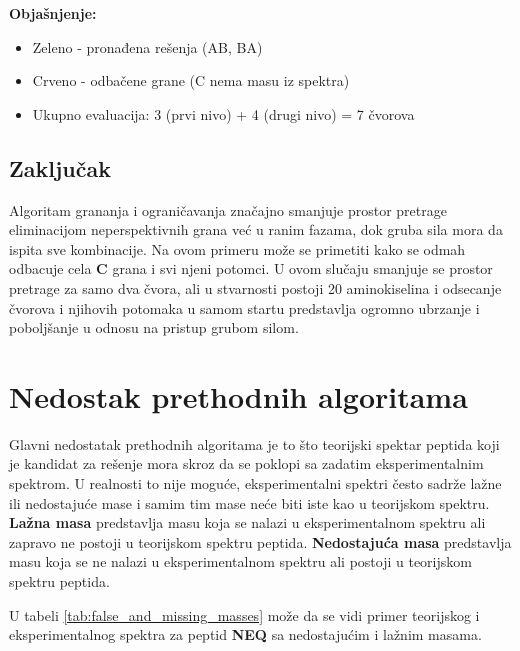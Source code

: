 \documentclass[12pt,oneside]{memoir}
\begin{document}
\textbf{Objašnjenje:}
\begin{itemize}
    \item \textcolor{green!50!black}{Zeleno} - pronađena rešenja (AB, BA)
    \item \textcolor{red!50!black}{Crveno} - odbačene grane (C nema masu iz spektra)
    \item Ukupno evaluacija: 3 (prvi nivo) + 4 (drugi nivo) = 7 čvorova
\end{itemize}

\subsection{Zaključak}

Algoritam grananja i ograničavanja značajno smanjuje prostor pretrage eliminacijom neperspektivnih grana već u ranim fazama, dok gruba sila mora da ispita sve kombinacije.
Na ovom primeru može se primetiti kako se odmah odbacuje cela \textbf{C} grana i svi njeni potomci. U ovom slučaju smanjuje se prostor pretrage za samo dva čvora, ali u stvarnosti postoji 20 aminokiselina i odsecanje čvorova i njihovih potomaka u samom startu predstavlja ogromno ubrzanje i poboljšanje u odnosu na pristup grubom silom.

\section{Nedostak prethodnih algoritama}

Glavni nedostatak prethodnih algoritama je to što teorijski spektar peptida koji je kandidat za rešenje mora skroz da se poklopi sa zadatim eksperimentalnim spektrom. U realnosti to nije moguće, eksperimentalni spektri često sadrže lažne ili nedostajuće mase i samim tim mase neće biti iste kao u teorijskom spektru.
\textbf{Lažna masa} predstavlja masu koja se nalazi u eksperimentalnom spektru ali zapravo ne postoji u teorijskom spektru peptida.
\textbf{Nedostajuća masa} predstavlja masu koja se ne nalazi u eksperimentalnom spektru ali postoji u teorijskom spektru peptida.

U tabeli \ref{tab:false_and_missing_masses} može da se vidi primer teorijskog i eksperimentalnog spektra za peptid \textbf{NEQ} sa nedostajućim i lažnim masama.
\end{document}
